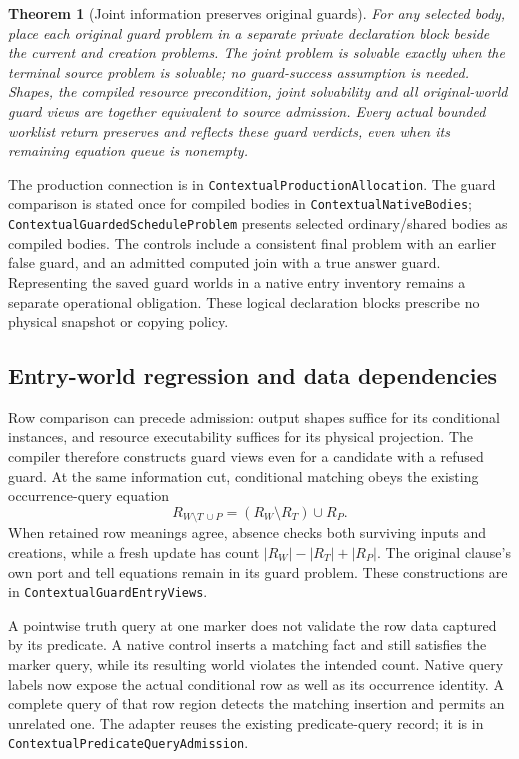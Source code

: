 \documentclass[11pt]{article}
\newtheorem{theorem}{Theorem}
\newcommand{\code}[1]{\texttt{\small #1}}
\begin{document}
\begin{theorem}[Joint information preserves original guards]
For any selected body, place each original guard problem in a separate
private declaration block beside the current and creation problems.
The joint problem is solvable exactly when the terminal source problem
is solvable; no guard-success assumption is needed. Shapes, the compiled
resource precondition, joint solvability and all original-world guard
views are together equivalent to source admission. Every actual bounded
worklist return preserves and reflects these guard verdicts, even when
its remaining equation queue is nonempty.
\end{theorem}
The production connection is in
\code{ContextualProductionAllocation}.
The guard comparison is stated once for compiled bodies in
\code{ContextualNativeBodies}; \code{ContextualGuardedScheduleProblem}
presents selected ordinary/shared bodies as compiled bodies.
The controls include a consistent final problem with an earlier false
guard, and an admitted computed join with a true answer guard. Representing
the saved guard worlds in a native entry inventory remains a separate
operational obligation. These logical declaration blocks prescribe no
physical snapshot or copying policy.

\subsection{Entry-world regression and data dependencies}

Row comparison can precede admission: output shapes suffice for its
conditional instances, and resource executability suffices for its
physical projection. The compiler therefore constructs guard views even
for a candidate with a refused guard. At the same information cut,
conditional matching obeys the existing occurrence-query equation
\[
 R_{W\setminus T\,\cup P}
   = (R_W\setminus R_T)\cup R_P.
\]
When retained row meanings agree, absence checks both surviving inputs
and creations, while a fresh update has count
$|R_W|-|R_T|+|R_P|$. The original clause's own port and tell equations
remain in its guard problem. These constructions are in
\code{ContextualGuardEntryViews}.

A pointwise truth query at one marker does not validate the row data
captured by its predicate. A native control inserts a matching fact and
still satisfies the marker query, while its resulting world violates
the intended count. Native query labels now expose the actual conditional
row as well as its occurrence identity. A complete query of that row
region detects the matching insertion and permits an unrelated one.
The adapter reuses the existing predicate-query record; it is in
\code{ContextualPredicateQueryAdmission}.
\end{document}
